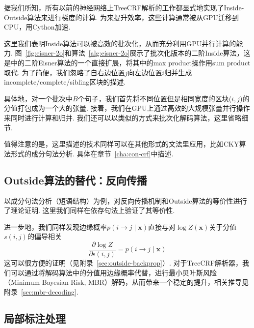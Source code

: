 

据我们所知，所有以前的神经网络上TreeCRF解析的工作都显式地实现了Inside-Outside算法来进行梯度的计算\cite{zhang-etal-2019-empirical, jiang-etal-2018-supervised}.
为来提升效率，这些计算通常被从GPU迁移到CPU，用Cython加速.

这里我们表明Inside算法可以被高效的批次化，从而充分利用GPU并行计算的能力.
图~\ref{fig:eisner-2o}和算法~\ref{alg:eisner-2o}展示了批次化版本的二阶Inside算法，这是\cite{mcdonald-pereira-2006-online}中的二阶Eisner算法的一个直接扩展，将其中的max product操作用sum product取代.
为了简便，我们忽略了自右边位置$j$向左边位置$i$归并生成incomplete/complete/sibling区块的描述.

具体地，对一个批次中$B$个句子，我们首先将不同位置但是相同宽度的区块($i, j$)的分值打包成为一个大的张量.
接着，我们在GPU上通过高效的大规模张量并行操作来同时进行计算和归并.
我们还可以以类似的方式来批次化解码算法，这里省略细节.

值得注意的是，这里描述的技术同样可以在其他形式的文法里应用，比如CKY算法形式的成分句法分析\cite{finkel-etal-2008-efficient,drozdov-etal-2019-unsupervised-latent}.
具体在章节~\ref{cha:con-crf}中描述.

\subsection{Outside算法的替代：反向传播}

\cite{eisner-2016-inside}以成分句法分析（短语结构）为例，对反向传播机制和Outside算法的等价性进行了理论证明.
这里我们同样在依存句法上验证了其等价性.

进一步地，我们同样发现边缘概率$p(i \rightarrow j\mid\boldsymbol{x})$直接与对$\log Z(\boldsymbol{x})$关于分值$s(i,j)$的偏导相关
\begin{equation}
    \label{eq:partial-derivative}
    \frac{\partial \log Z}{\partial \mathrm{s}(i, j)} = p(i \rightarrow j\mid\boldsymbol{x})
\end{equation}
这可以很方便的证明（见附录~\ref{sec:outside-backprop}）.
对于TreeCRF解析器，我们可以通过将解码算法中的分值用边缘概率代替，进行最小贝叶斯风险（Minimum Bayesian Risk, MBR）解码\cite{smith-smith-2007-probabilistic}，从而带来一个稳定的提升，相关推导见附录~\ref{sec:mbr-decoding}.

\subsection{局部标注处理}
\label{sub@section:partial-annotation}

